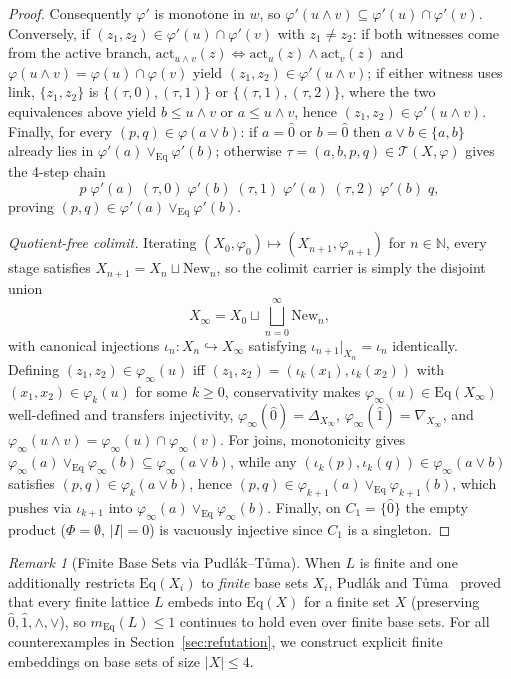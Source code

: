 \documentclass[11pt]{article}
\theoremstyle{definition}
\theoremstyle{remark}
\newtheorem{remark}[theorem]{Remark}
\newcommand{\Eq}{\mathrm{Eq}}
\begin{document}
\begin{proof}
Consequently $\varphi'$ is monotone in $w$, so $\varphi'(u \wedge v) \subseteq \varphi'(u) \cap \varphi'(v)$. Conversely, if $(z_1,z_2) \in \varphi'(u) \cap \varphi'(v)$ with $z_1 \neq z_2$: if both witnesses come from the active branch, $\mathrm{act}_{u \wedge v}(z) \iff \mathrm{act}_u(z) \land \mathrm{act}_v(z)$ and $\varphi(u \wedge v) = \varphi(u) \cap \varphi(v)$ yield $(z_1,z_2) \in \varphi'(u \wedge v)$; if either witness uses $\mathrm{link}$, $\{z_1,z_2\}$ is $\{(\tau,0),(\tau,1)\}$ or $\{(\tau,1),(\tau,2)\}$, where the two equivalences above yield $b \le u \wedge v$ or $a \le u \wedge v$, hence $(z_1,z_2) \in \varphi'(u \wedge v)$. Finally, for every $(p,q) \in \varphi(a \vee b)$: if $a = \hat{0}$ or $b = \hat{0}$ then $a \vee b \in \{a,b\}$ already lies in $\varphi'(a) \vee_{\Eq} \varphi'(b)$; otherwise $\tau = (a,b,p,q) \in \mathcal{T}(X,\varphi)$ gives the 4-step chain
\[
  p \;\mathrel{\varphi'(a)}\; (\tau,0) \;\mathrel{\varphi'(b)}\; (\tau,1)
    \;\mathrel{\varphi'(a)}\; (\tau,2) \;\mathrel{\varphi'(b)}\; q,
\]
proving $(p,q) \in \varphi'(a) \vee_{\Eq} \varphi'(b)$.

\emph{Quotient-free colimit.} Iterating $(X_0,\varphi_0) \mapsto (X_{n+1},\varphi_{n+1})$ for $n \in \mathbb{N}$, every stage satisfies $X_{n+1} = X_n \sqcup \mathrm{New}_n$, so the colimit carrier is simply the disjoint union
\[
  X_\infty = X_0 \sqcup \bigsqcup_{n=0}^{\infty} \mathrm{New}_n,
\]
with canonical injections $\iota_n \colon X_n \hookrightarrow X_\infty$ satisfying $\iota_{n+1}|_{X_n} = \iota_n$ identically. Defining $(z_1,z_2) \in \varphi_\infty(u)$ iff $(z_1,z_2) = (\iota_k(x_1),\iota_k(x_2))$ with $(x_1,x_2) \in \varphi_k(u)$ for some $k \ge 0$, conservativity makes $\varphi_\infty(u) \in \Eq(X_\infty)$ well-defined and transfers injectivity, $\varphi_\infty(\hat{0}) = \Delta_{X_\infty}$, $\varphi_\infty(\hat{1}) = \nabla_{X_\infty}$, and $\varphi_\infty(u \wedge v) = \varphi_\infty(u) \cap \varphi_\infty(v)$. For joins, monotonicity gives $\varphi_\infty(a) \vee_{\Eq} \varphi_\infty(b) \subseteq \varphi_\infty(a \vee b)$, while any $(\iota_k(p),\iota_k(q)) \in \varphi_\infty(a \vee b)$ satisfies $(p,q) \in \varphi_k(a \vee b)$, hence $(p,q) \in \varphi_{k+1}(a) \vee_{\Eq} \varphi_{k+1}(b)$, which pushes via $\iota_{k+1}$ into $\varphi_\infty(a) \vee_{\Eq} \varphi_\infty(b)$. Finally, on $C_1 = \{\hat{0}\}$ the empty product ($\Phi = \emptyset$, $|I|=0$) is vacuously injective since $C_1$ is a singleton.
\end{proof}

\begin{remark}[Finite Base Sets via Pudl\'ak--T\r{u}ma]
When $L$ is finite and one additionally restricts $\Eq(X_i)$ to \emph{finite} base sets $X_i$, Pudl\'ak and T\r{u}ma~\cite{PudlakTuma1980} proved that every finite lattice $L$ embeds into $\Eq(X)$ for a finite set $X$ (preserving $\hat{0},\hat{1},\wedge,\vee$), so $m_{\Eq}(L) \le 1$ continues to hold even over finite base sets. For all counterexamples in Section~\ref{sec:refutation}, we construct explicit finite embeddings on base sets of size $|X| \le 4$.
\end{remark}
\end{document}
